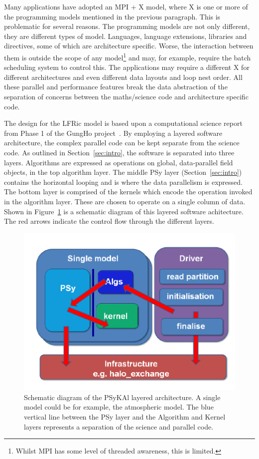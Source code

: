 \documentclass[times]{elsarticle}
\begin{document}
Many applications have adopted an MPI + X model, where X is one or
more of the programming models mentioned in the previous paragraph. This
is problematic for several reasons. The programming models are not
only different, they are different types of model. Languages, language
extensions, libraries and directives, some of which are architecture
specific. Worse, the interaction between them is outside the scope of
any model\footnote{Whilst MPI has some level of threaded awareness,
  this is limited.} and may, for example, require the batch scheduling
system to control this. The applications may require a different X for
different architectures and even different data layouts and
loop nest order. All these parallel and performance features
break the data abstraction of the separation of concerns between the
maths/science code and architecture specific code.

The design for the LFRic model is based upon a computational science
report from Phase 1 of the GungHo project~\cite{GHP1_CSR}. By
employing a layered software architecture, the complex parallel code
can be kept separate from the science code. As outlined in 
Section~\ref{sec:intro}, the software is separated into three layers.
Algorithms are expressed as operations on global, data-parallel field objects,
in the top algorithm layer. The middle PSy layer (Section~\ref{sec:intro}) 
contains the horizontal looping and is where the data parallelism is expressed. 
The bottom layer is comprised of the kernels which encode the operation invoked in the
algorithm layer. These are chosen to operate on a single column of data. 
Shown in Figure~\ref{fig:psykal} is a schematic diagram of this
layered software achitecture. The red arrows indicate the control flow
through the different layers. 

\begin{figure}
\centering\includegraphics[width=0.8\linewidth]{PSyKAl.pdf}
\caption{\label{fig:psykal} Schematic diagram of the PSyKAl layered
  architecture. A single model could be for example, the atmospheric
  model. The blue vertical line between the PSy layer and the
  Algorithm and Kernel layers represents a separation of the science
  and parallel code.}
\end{figure}
\end{document}

